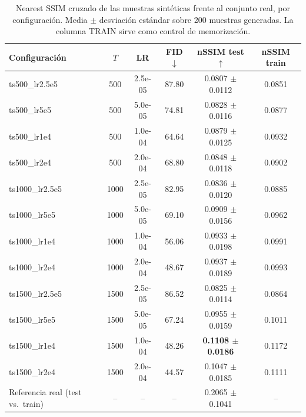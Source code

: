\begin{table}[ht]
\caption{Nearest SSIM cruzado de las muestras sintéticas frente al conjunto real, por configuración. Media $\pm$ desviación estándar sobre 200 muestras generadas. La columna TRAIN sirve como control de memorización.}
\label{tab:nssim}
\centering
\footnotesize
\setlength{\tabcolsep}{4pt}
\begin{tabular}{lccccc}
\toprule
Configuración & $T$ & LR & FID $\downarrow$ & nSSIM test $\uparrow$ & nSSIM train \\
\midrule
ts500\_lr2.5e5 & 500 & 2.5e-05 & 87.80 & 0.0807 $\pm$ 0.0112 & 0.0851 \\
ts500\_lr5e5 & 500 & 5.0e-05 & 74.81 & 0.0828 $\pm$ 0.0116 & 0.0877 \\
ts500\_lr1e4 & 500 & 1.0e-04 & 64.64 & 0.0879 $\pm$ 0.0125 & 0.0932 \\
ts500\_lr2e4 & 500 & 2.0e-04 & 68.80 & 0.0848 $\pm$ 0.0118 & 0.0902 \\
ts1000\_lr2.5e5 & 1000 & 2.5e-05 & 82.95 & 0.0836 $\pm$ 0.0120 & 0.0885 \\
ts1000\_lr5e5 & 1000 & 5.0e-05 & 69.10 & 0.0909 $\pm$ 0.0156 & 0.0962 \\
ts1000\_lr1e4 & 1000 & 1.0e-04 & 56.06 & 0.0933 $\pm$ 0.0198 & 0.0991 \\
ts1000\_lr2e4 & 1000 & 2.0e-04 & 48.67 & 0.0937 $\pm$ 0.0189 & 0.0993 \\
ts1500\_lr2.5e5 & 1500 & 2.5e-05 & 86.52 & 0.0825 $\pm$ 0.0114 & 0.0864 \\
ts1500\_lr5e5 & 1500 & 5.0e-05 & 67.24 & 0.0955 $\pm$ 0.0159 & 0.1011 \\
ts1500\_lr1e4 & 1500 & 1.0e-04 & 48.26 & \textbf{0.1108 $\pm$ 0.0186} & 0.1172 \\
ts1500\_lr2e4 & 1500 & 2.0e-04 & 44.57 & 0.1047 $\pm$ 0.0185 & 0.1111 \\
\midrule
Referencia real (test vs.\ train) & -- & -- & -- & 0.2065 $\pm$ 0.1041 & -- \\
\bottomrule
\end{tabular}
\end{table}
